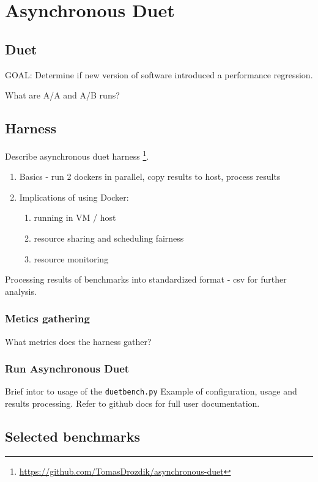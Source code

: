 \chapter{Asynchronous Duet}
\label{chap:duet}

\section{Duet}

GOAL: Determine if new version of software introduced a performance regression.

What are A/A and A/B runs?

\section{Harness}

Describe asynchronous duet harness \footnote{\url{https://github.com/TomasDrozdik/asynchronous-duet}}.

\begin{enumerate}
	\item Basics - run 2 dockers in parallel, copy results to host, process results
	\item Implications of using Docker:
	\begin{enumerate}
		\item running in VM / host
		\item resource sharing and scheduling fairness
		\item resource monitoring
	\end{enumerate}
\end{enumerate}

Processing results of benchmarks into standardized format - csv for further analysis.

\subsection{Metics gathering}

What metrics does the harness gather?

\subsection{Run Asynchronous Duet}

Brief intor to usage of the \lstinline{duetbench.py} Example of configuration, usage and results processing.
Refer to github docs  for full user documentation.


\section{Selected benchmarks}

